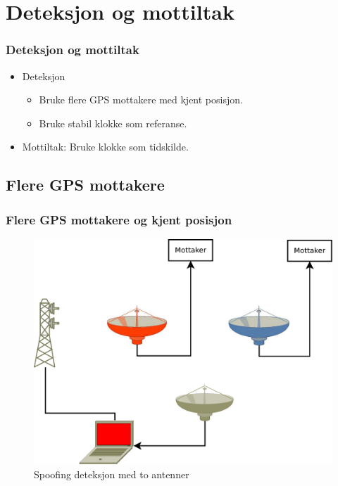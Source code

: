 \documentclass[xcolor=table]{beamer}
\begin{document}
\section{Deteksjon og mottiltak}
\begin{frame}
\frametitle{Deteksjon og mottiltak}
  \begin{itemize}
    \item Deteksjon
    \begin{itemize}
      \item Bruke flere GPS mottakere med kjent posisjon.
      \item Bruke stabil klokke som referanse.
    \end{itemize}
    \item Mottiltak: Bruke klokke som tidskilde.
  \end{itemize}
\end{frame}

\subsection{Flere GPS mottakere}
\begin{frame} 
  \frametitle{Flere GPS mottakere og kjent posisjon}
  \begin{figure}
    \includegraphics[scale=0.2]{thesis/graphics/toantenner.pdf}
    \caption{Spoofing deteksjon med to antenner}
  \end{figure}
\end{frame}
\end{document}
